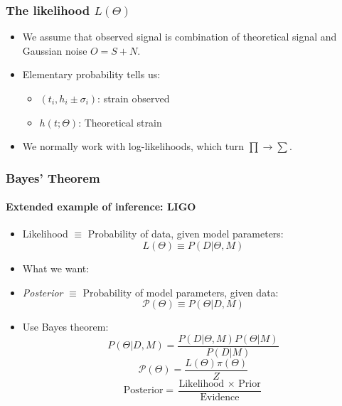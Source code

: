 \documentclass[%
]{beamer}
\begin{document}
\begin{frame}
    \frametitle{The likelihood $L(\Theta)$}
    \begin{itemize}
        \item<1-> We assume that observed signal is combination of theoretical signal and Gaussian noise $O = S + N$.
        \item<2-> Elementary probability tells us:
            \begin{itemize}
                \item<3-> $(t_i,h_i\pm\sigma_i)$: strain observed 
                \item<4-> $h(t;\Theta)$: Theoretical strain 
            \end{itemize}
        \item<8-> We normally work with log-likelihoods, which turn $\prod\to\sum$.
    \end{itemize}
\end{frame}

\begin{frame}
    \frametitle{Bayes' Theorem}
    \framesubtitle{Extended example of inference: LIGO}
    \begin{itemize}
        \item Likelihood \pause$\equiv$ Probability of data, given model parameters: 
            \pause\[L(\Theta) \equiv P(D|\Theta,M)\] 
        \pause \item What we want: 
        \item {\em Posterior} \pause$\equiv$ Probability of model parameters, given data:
            \pause\[\mathcal{P}(\Theta) \equiv P(\Theta|D,M)\] 
            \pause \item Use Bayes theorem:
            \pause \[ P(\Theta|D,M) = \frac{P(D|\Theta, M) P(\Theta|M)}{P(D|M)}\]
            \pause \[ \mathcal{P}(\Theta) = \frac{L(\Theta) \pi(\Theta)}{Z}\]
            \pause \[ \text{Posterior} = \frac{\text{Likelihood $\times$ Prior}}{\text{Evidence}}\]
    \end{itemize}
\end{frame}
\end{document}
